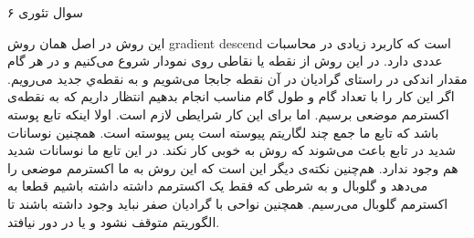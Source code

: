 سوال تئوری ۶

این روش در اصل همان روش gradient descend است که کاربرد زیادی در محاسبات عددی دارد. در این روش از نقطه یا نقاطی روی نمودار شروع می‌کنیم و در هر گام مقدار اندکی در راستای گرادیان در آن نقطه جابجا می‌شویم و به نقطه‌ي جدید می‌رویم. اگر این کار را با تعداد گام و طول گام مناسب انجام بدهیم انتظار داریم که به نقطه‌ی اکسترمم موضعی برسیم. 
اما برای این کار شرایطی لازم است. اولا اینکه تابع پوسته باشد که تابع ما جمع چند لگاریتم پیوسته است پس پیوسته است. همچنین نوسانات شدید در تابع باعث می‌شوند که روش به خوبی کار نکند. در این تابع ما نوسانات شدید هم وجود ندارد. هم‌چنین نکته‌ی دیگر این است که این روش به ما اکسترمم موضعی را می‌دهد و گلوبال و به شرطی که فقط یک اکسترمم داشته داشته باشیم قطعا به اکسترمم گلوبال می‌رسیم. همچنین نواحی با گرادیان صفر نباید وجود داشته باشند تا الگوریتم متوقف نشود و یا در دور نیافتد.